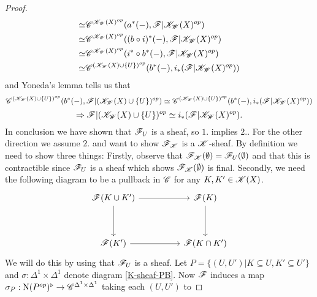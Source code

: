 \documentclass[../thesis.tex]{subfiles}
\begin{document}
\begin{proof}
\begin{align}
        \simeq                                                                             & \mathscr{C}^{\mathscr{K}_{\mathscr{W}}(X)^{op}}(a^*({-}), \mathscr{F}|\mathscr{K}_{\mathscr{W}}(X)^{op})                  \\
        \simeq                                                                             & \mathscr{C}^{\mathscr{K}_{\mathscr{W}}(X)^{op}}((b\circ i)^*({-}), \mathscr{F}|\mathscr{K}_{\mathscr{W}}(X)^{op})         \\        \simeq                                                                             & \mathscr{C}^{\mathscr{K}_{\mathscr{W}}(X)^{op}}(i^* \circ b^*({-}), \mathscr{F}|\mathscr{K}_{\mathscr{W}}(X)^{op})            \\
        \simeq                                                                             & \mathscr{C}^{(\mathscr{K}_{\mathscr{W}}(X)\cup \{U\})^{op}}(b^*({-}), i_*(\mathscr{F}|\mathscr{K}_{\mathscr{W}}(X)^{op}))
    \end{align}
    and Yoneda's lemma tells us that
    \[\mathscr{C}^{(\mathscr{K}_{\mathscr{W}}(X)\cup \{U\})^{op}}(b^*({-}),\mathscr{F}|(\mathscr{K}_{\mathscr{W}}(X)\cup \{U\})^{op}) \simeq \mathscr{C}^{(\mathscr{K}_{\mathscr{W}}(X)\cup \{U\})^{op}}(b^*({-}), i_*(\mathscr{F}|\mathscr{K}_{\mathscr{W}}(X)^{op}))\]
    \[\Rightarrow \mathscr{F}|(\mathscr{K}_{\mathscr{W}}(X)\cup \{U\})^{op} \simeq i_*(\mathscr{F}|\mathscr{K}_{\mathscr{W}}(X)^{op}).\]
    In conclusion we have shown that $\mathscr{F}_{U}$ is a sheaf, so $1.$ implies $2.$.
    For the other direction we assume $2.$ and want to show $\mathscr{F}_{\mathscr{K}}$ is a $\mathscr{K}$-sheaf. By definition we need to show three things:
    Firstly, observe that $\mathscr{F}_{\mathscr{K}}(\emptyset) = \mathscr{F}_{U}(\emptyset)$ and that this is contractible since $\mathscr{F}_{U}$ is a sheaf which shows $\mathscr{F}_{\mathscr{K}}(\emptyset)$ is final.
    Secondly, we need the following diagram to be a pullback in $\mathscr{C}$ for any $K,K' \in \mathscr{K}(X)$.
    \begin{equation}\label{K-sheaf-PB}
        \begin{tikzcd}
            {\F(K \cup K')} && {\F(K)} \\
            \\
            {\F(K')} && {\F(K\cap K')}
            \arrow[from=1-3, to=3-3]
            \arrow[from=3-1, to=3-3]
            \arrow[from=1-1, to=3-1]
            \arrow[from=1-1, to=1-3]
        \end{tikzcd}
    \end{equation}
    We will do this by using that $\mathscr{F}_{U}$ is a sheaf.
    Let $P = \{(U,U') | K \subseteq U, K' \subseteq U'\}$ and $\sigma: \Delta^1\times\Delta^1$ denote diagram \ref{K-sheaf-PB}.
    Now $\mathscr{F}$ induces a map $\sigma_P: \mathrm{N}(P^{op})^{\triangleright} \to \mathscr{C}^{\Delta^1\times\Delta^1}$ taking each $(U, U')$ to

\end{proof}
\end{document}
